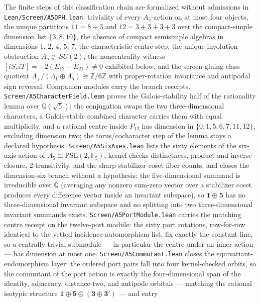 \documentclass[11pt]{article}
\begin{document}
The finite steps of this classification chain are formalized without
admissions in
\texttt{Lean/\allowbreak Screen/\allowbreak A5OPH.lean}:
triviality of every \(A_5\)-action on at most four objects, the unique
partitions \(11=8+3\) and \(12=3+3+3+3\) over the compact-simple dimension
list \(\{3,8,10\}\), the absence of compact semisimple algebras in dimensions
\(1\), \(2\), \(4\), \(5\), \(7\), the characteristic-centre step, the
unique-involution obstruction \(A_5\not\subset SU(2)\), the noncentrality
witness \([iS,iT]=-2(E_{12}-E_{21})\neq0\) exhibited below, and the screen
gluing-class quotient
\(\Lambda_+/(\Lambda_1\oplus\Lambda_5)\cong\mathbb Z/6\mathbb Z\) with
proper-rotation invariance and antipodal sign reversal. Companion modules
carry the branch receipts.
\texttt{Screen/\allowbreak A5CharacterField.lean} proves the Galois-stability
half of the rationality lemma over \(\mathbb Q(\sqrt5)\): the conjugation
swaps the two three-dimensional characters, a Galois-stable combined
character carries them with equal multiplicity, and a rational centre inside
\(P_{12}\) has dimension in \(\{0,1,5,6,7,11,12\}\), excluding dimension two;
the torus/cocharacter step of the lemma stays a declared hypothesis.
\texttt{Screen/\allowbreak A5SixAxes.lean} lists the sixty elements of the
six-axis action of \(A_5\cong\mathrm{PSL}(2,\mathbb F_5)\), kernel-checks
distinctness, product and inverse closure, 2-transitivity, and the sharp
stabilizer-coset fiber counts, and closes the dimension-six branch without a
hypothesis: the five-dimensional summand is irreducible over \(\mathbb Q\)
(averaging any nonzero sum-zero vector over a stabilizer coset produces every
difference vector inside an invariant subspace), so
\(\mathbf1\oplus\mathbf5\) has no three-dimensional invariant subspace and no
splitting into two three-dimensional invariant summands exists.
\texttt{Screen/\allowbreak A5PortModule.lean} carries the matching centre
receipt on the twelve-port module: the sixty port rotations, row-for-row
identical to the vetted incidence-automorphism list, fix exactly the constant
line, so a centrally trivial submodule --- in particular the centre under an
inner action --- has dimension at most one.
\texttt{Screen/\allowbreak A5Commutant.lean} closes the
equivariant-endomorphism layer: the ordered port pairs fall into four
kernel-checked orbits, so the commutant of the port action is exactly the
four-dimensional span of the identity, adjacency, distance-two, and antipode
orbitals --- matching the rational isotypic structure
\(\mathbf1\oplus\mathbf5\oplus(\mathbf3\oplus\mathbf3')\) --- and entry
\end{document}

